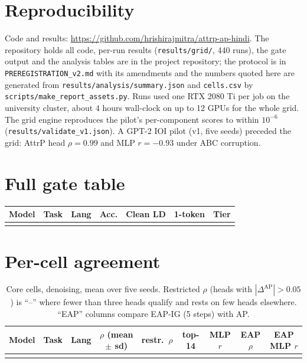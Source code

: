 \documentclass[10pt,a4paper]{article}
\newcommand{\AP}{\mathrm{AP}}
\begin{document}
\section{Reproducibility}
Code and results: \url{https://github.com/hrishirajmitra/attrp-ap-hindi}. The repository holds all code, per-run results (\texttt{results/grid/}, 440 runs), the gate output and the analysis tables are in the project repository; the protocol is in \texttt{PREREGISTRATION\_v2.md} with its amendments and the numbers quoted here are generated from \texttt{results/analysis/summary.json} and \texttt{cells.csv} by \texttt{scripts/make\_report\_assets.py}. Runs used one RTX 2080 Ti per job on the university cluster, about 4 hours wall-clock on up to 12 GPUs for the whole grid. The grid engine reproduces the pilot's per-component scores to within $10^{-6}$ (\texttt{results/validate\_v1.json}). A GPT-2 IOI pilot (v1, five seeds) preceded the grid: AttrP head $\rho=0.99$ and MLP $r=-0.93$ under ABC corruption.




\clearpage
\appendix
\section{Full gate table}\label{app:gate}
{\small
\begin{longtable}{@{}lllrrrl@{}}
\toprule
Model & Task & Lang & Acc. & Clean LD & 1-token & Tier\\
\midrule
\endhead
\bottomrule
\endlastfoot
\\
\end{longtable}}

\section{Per-cell agreement}
\begin{table}[h]
\centering\small
\setlength{\tabcolsep}{4pt}
\begin{tabular}{@{}lllcccccc@{}}
\toprule
Model & Task & Lang & $\rho$ (mean $\pm$ sd) & restr.\ $\rho$ & top-14 & MLP $r$ & EAP $\rho$ & EAP MLP $r$\\
\midrule
\\
\bottomrule
\end{tabular}
\caption{Core cells, denoising, mean over five seeds. Restricted $\rho$ (heads with $|\Delta^{\AP}|>0.05$) is ``--'' where fewer than three heads qualify and rests on few heads elsewhere. ``EAP'' columns compare EAP-IG (5 steps) with AP.}
\label{tab:cells}
\end{table}
\end{document}
